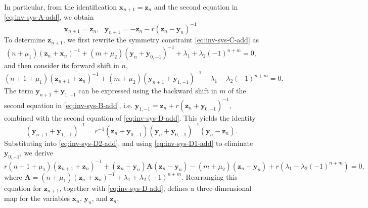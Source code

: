\documentclass[dvips,10pt]{article}
\newcommand{\bs}{\boldsymbol}
\newcommand{\bsx}{ {\bs{x}}}
\newcommand{\bsz}{ {\bs{z}}}
\newcommand{\bsy}{ {\bs{y}}}
\theoremstyle{remark} %
\begin{document}
In particular, from the identification $\bsx_{n+1} = \bsz_n$ and the second equation in \eqref{eq:inv-sys-A-add}, we obtain
	\begin{equation} \label{eq:inv-sys-D-add}
		{\bs{x}}_{n+1} = {\bs{z}}_n, ~~~ {\bs{y}}_{n+1} = -{\bs{z}}_n -r ({\bs{z}}_{n}-{\bs{y}}_{n})^{-1}.
	\end{equation}
	To determine $\bsz_{n+1}$, we first rewrite the symmetry constraint \eqref{eq:inv-sys-C-add} as
	\begin{equation} \label{eq:inv-sys-D1-add}
		(n + \mu_1) (\bsz_n+ \bsx_n)^{-1} + (m+\mu_2) (\bsy_n + \bsy_{0,-1})^{-1} + \lambda_1 + \lambda_2 (-1)^{n+m} =0,
	\end{equation}
	and then consider its forward shift in $n$, 
	\begin{equation} \label{eq:inv-sys-D2-add}
		(n +1 + \mu_1) (\bsz_{n+1}+ \bsz_n)^{-1} + (m+\mu_2) (\bsy_{n+1} + \bsy_{1,-1})^{-1} + \lambda_1 - \lambda_2 (-1)^{n+m} =0.
	\end{equation}
	The term $\bsy_{n+1} + \bsy_{1,-1}$ can be expressed using the backward shift in $m$ of the second equation in \eqref{eq:inv-sys-B-add}, i.e. 	${\bs{y}}_{1,-1} ={\bs{z}}_n + r \left({\bs{z}}_{n}+ \bsy_{0,-1}\right)^{-1}$, combined with the second equation of \eqref{eq:inv-sys-D-add}. This yields the identity 
	$$ \left(\bsy_{n+1} + \bsy_{1,-1}\right)^{-1} = r^{-1}  (\bsz_n+\bsy_{0,-1}) (\bsy_n + \bsy_{0,-1})^{-1} (\bsy_n-\bsz_n). $$
	Substituting into \eqref{eq:inv-sys-D2-add}, and using \eqref{eq:inv-sys-D1-add} to eliminate $\bsy_{0,-1}$, we derive
	\begin{equation} \label{eq:inv-sys-D3-add}
		r (n+1+\mu_1) ({\bs{z}}_{n+1}+{\bs{z}}_n)^{-1} + ({\bs{z}}_n-\bsy_n) {\bs{A}}  ({\bs{z}}_n-\bsy_n) - (m+\mu_2)  ({\bs{z}}_n-\bsy_n) + r (\lambda_1 - \lambda_2 (-1)^{n+m}) =0,
	\end{equation}
	where ${\bs{A}} = (n+ \mu_1) ({\bs{z}}_n + \bsx_n)^{-1} + \lambda_1 + \lambda_2 (-1)^{n+m}$. Rearranging this equation for $\bsz_{n+1}$, together with \eqref{eq:inv-sys-D-add}, defines a three-dimensional map for the variables $\bsx_n$, $\bsy_n$, and $\bsz_n$.
	
\end{document}
